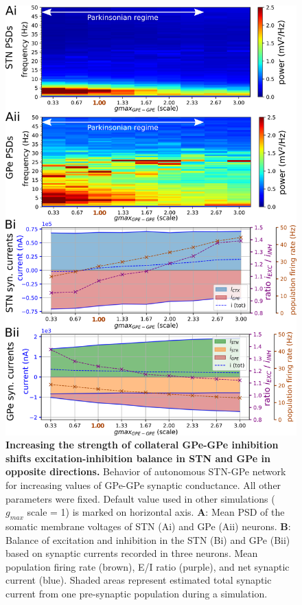 %
\begin{figure}
\centering
\includegraphics[height=\dimexpr \textheight - 10\baselineskip\relax]{ch_detailed_model/figs_split/fig_endogenous_sweep-gmax-gpe-gpe_A-psd-currents.png}
\caption{
\textbf{Increasing the strength of collateral GPe-GPe inhibition shifts excitation-inhibition balance in STN and GPe in opposite directions.}
Behavior of autonomous STN-GPe network for increasing values of GPe-GPe synaptic conductance. All other parameters were fixed. Default value used in other simulations ({\color{brown} $g_{max}$ scale = 1}) is marked on horizontal axis.
\textbf{A}: Mean PSD of the somatic membrane voltages of STN (Ai) and GPe (Aii) neurons.
\textbf{B}: Balance of excitation and inhibition in the STN (Bi) and GPe (Bii) based on synaptic currents recorded in three neurons. Mean population firing rate (brown), E/I ratio (purple), and net synaptic current (blue). Shaded areas represent estimated total synaptic current from one pre-synaptic population during a simulation.
}
\label{fig:endogenous_sweep-gmax-gpe-gpe_A-psd-currents}
\end{figure}

